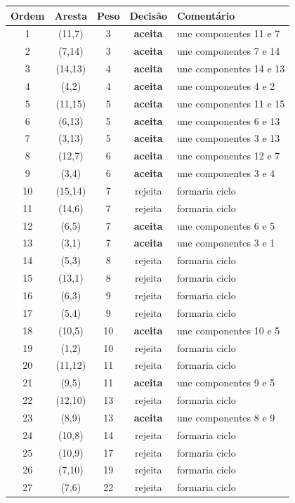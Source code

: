 \begin{footnotesize}
\begin{longtable}{c c c c p{5.5cm}}
\toprule
Ordem & Aresta & Peso & Decis\~ao & Coment\'ario \\
\midrule
\endhead
1 & (11,7) & 3 & \textbf{aceita} & une componentes {11} e {7} \\
2 & (7,14) & 3 & \textbf{aceita} & une componentes {7} e {14} \\
3 & (14,13) & 4 & \textbf{aceita} & une componentes {14} e {13} \\
4 & (4,2) & 4 & \textbf{aceita} & une componentes {4} e {2} \\
5 & (11,15) & 5 & \textbf{aceita} & une componentes {11} e {15} \\
6 & (6,13) & 5 & \textbf{aceita} & une componentes {6} e {13} \\
7 & (3,13) & 5 & \textbf{aceita} & une componentes {3} e {13} \\
8 & (12,7) & 6 & \textbf{aceita} & une componentes {12} e {7} \\
9 & (3,4) & 6 & \textbf{aceita} & une componentes {3} e {4} \\
10 & (15,14) & 7 & rejeita & formaria ciclo \\
11 & (14,6) & 7 & rejeita & formaria ciclo \\
12 & (6,5) & 7 & \textbf{aceita} & une componentes {6} e {5} \\
13 & (3,1) & 7 & \textbf{aceita} & une componentes {3} e {1} \\
14 & (5,3) & 8 & rejeita & formaria ciclo \\
15 & (13,1) & 8 & rejeita & formaria ciclo \\
16 & (6,3) & 9 & rejeita & formaria ciclo \\
17 & (5,4) & 9 & rejeita & formaria ciclo \\
18 & (10,5) & 10 & \textbf{aceita} & une componentes {10} e {5} \\
19 & (1,2) & 10 & rejeita & formaria ciclo \\
20 & (11,12) & 11 & rejeita & formaria ciclo \\
21 & (9,5) & 11 & \textbf{aceita} & une componentes {9} e {5} \\
22 & (12,10) & 13 & rejeita & formaria ciclo \\
23 & (8,9) & 13 & \textbf{aceita} & une componentes {8} e {9} \\
24 & (10,8) & 14 & rejeita & formaria ciclo \\
25 & (10,9) & 17 & rejeita & formaria ciclo \\
26 & (7,10) & 19 & rejeita & formaria ciclo \\
27 & (7,6) & 22 & rejeita & formaria ciclo \\
\bottomrule
\end{longtable}
\end{footnotesize}

